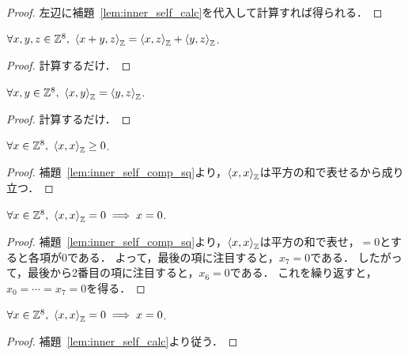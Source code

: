 \begin{proof}
  \leanok
  左辺に補題~\ref{lem:inner_self_calc}を代入して計算すれば得られる．
\end{proof}

\begin{theorem}
  \label{thm:add_inner}
  \leanok
  $\forall x, y, z \in \mathbb{Z}^8,\ \left\langle x + y, z \right\rangle_{\mathbb{Z}} = \left\langle x, z \right\rangle_{\mathbb{Z}} + \left\langle y, z \right\rangle_{\mathbb{Z}}$.
\end{theorem}

\begin{proof}
  \leanok
  計算するだけ．
\end{proof}

\begin{theorem}
  \label{thm:inner_sym}
  \leanok
  $\forall x, y \in \mathbb{Z}^8,\ \left\langle x, y \right\rangle_{\mathbb{Z}} = \left\langle y, z \right\rangle_{\mathbb{Z}}$.
\end{theorem}

\begin{proof}
  \leanok
  計算するだけ．
\end{proof}

\begin{theorem}
  \label{thm:inner_self}
  \leanok
  $\forall x \in \mathbb{Z}^8,\ \left\langle x, x \right\rangle_{\mathbb{Z}} \ge 0$.
\end{theorem}

\begin{proof}
  \leanok
  補題~\ref{lem:inner_self_comp_sq}より，$\left\langle x, x \right\rangle_{\mathbb{Z}}$は平方の和で表せるから成り立つ．
\end{proof}

\begin{theorem}
  \label{thm:inner_self_eq_zero}
  \leanok
  $\forall x \in \mathbb{Z}^8,\ \left\langle x, x \right\rangle_{\mathbb{Z}} = 0 \implies x = 0$.
\end{theorem}

\begin{proof}
  \leanok
  補題~\ref{lem:inner_self_comp_sq}より，$\left\langle x, x \right\rangle_{\mathbb{Z}}$は平方の和で表せ，$= 0$とすると各項が$0$である．
  よって，最後の項に注目すると，$x_7 = 0$である．
  したがって，最後から2番目の項に注目すると，$x_6 = 0$である．
  これを繰り返すと，$x_0 = \cdots = x_7 = 0$を得る．
\end{proof}

\begin{theorem}
  \label{thm:even}
  \leanok
  $\forall x \in \mathbb{Z}^8,\ \left\langle x, x \right\rangle_{\mathbb{Z}} = 0 \implies x = 0$.
\end{theorem}

\begin{proof}
  \leanok
  補題~\ref{lem:inner_self_calc}より従う．
\end{proof}
